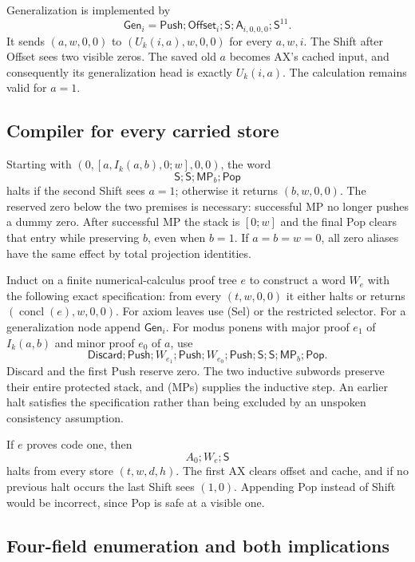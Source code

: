 Generalization is implemented by
\[
 \mathsf{Gen}_i=
 \mathsf{Push};\mathsf{Offset}_i;\mathsf S;
        \mathsf A_{i,0,0,0};\mathsf S^{11}.
\]
It sends $(a,w,0,0)$ to $(U_k(i,a),w,0,0)$ for every $a,w,i$.
The Shift after Offset sees two visible zeros.  The saved old $a$ becomes
AX's cached input, and consequently its generalization head is exactly
$U_k(i,a)$.  The calculation remains valid for $a=1$.

\subsection{Compiler for every carried store}

Starting with $(0,[a,I_k(a,b),0;w],0,0)$, the word
\[
              \mathsf S;\mathsf S;\mathsf{MP}_b;\mathsf{Pop}
                                                               \tag{MPs}
\]
halts if the second Shift sees $a=1$; otherwise it returns
$(b,w,0,0)$.  The reserved zero below the two premises is necessary:
successful MP no longer pushes a dummy zero.  After successful MP the
stack is $[0;w]$ and the final Pop clears that entry while preserving
$b$, even when $b=1$.  If $a=b=w=0$, all zero aliases have the same
effect by total projection identities.

Induct on a finite numerical-calculus proof tree $e$ to construct a word
$W_e$ with the following exact specification: from every $(t,w,0,0)$ it
either halts or returns $(\operatorname{concl}(e),w,0,0)$.
For axiom leaves use (Sel) or the restricted selector.  For a
generalization node append $\mathsf{Gen}_i$.  For modus ponens with
major proof $e_1$ of $I_k(a,b)$ and minor proof $e_0$ of $a$, use
\[
 \mathsf{Discard};\mathsf{Push};W_{e_1};\mathsf{Push};
 W_{e_0};\mathsf{Push};\mathsf S;\mathsf S;
                     \mathsf{MP}_b;\mathsf{Pop}.          \tag{Compile}
\]
Discard and the first Push reserve zero.  The two inductive subwords
preserve their entire protected stack, and (MPs) supplies the inductive
step.  An earlier halt satisfies the specification rather than being
excluded by an unspoken consistency assumption.

If $e$ proves code one, then
\[
                         A_0;W_e;\mathsf S              \tag{HaltWord}
\]
halts from every store $(t,w,d,h)$.  The first AX clears offset and cache,
and if no previous halt occurs the last Shift sees $(1,0)$.
Appending Pop instead of Shift would be incorrect, since Pop is safe at
a visible one.

\subsection{Four-field enumeration and both implications}

